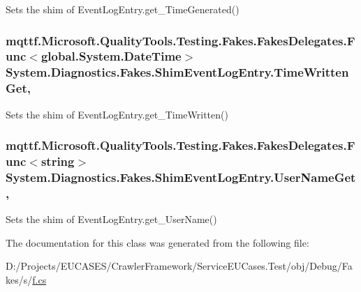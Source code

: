 Sets the shim of Event\-Log\-Entry.\-get\-\_\-\-Time\-Generated()

\hypertarget{class_system_1_1_diagnostics_1_1_fakes_1_1_shim_event_log_entry_a4a0c79ea960eb4727a22d11e10d6d453}{
\subsubsection[{Time\-Written\-Get}]{\setlength{\rightskip}{0pt plus 5cm}mqttf.\-Microsoft.\-Quality\-Tools.\-Testing.\-Fakes.\-Fakes\-Delegates.\-Func$<$global.\-System.\-Date\-Time$>$ System.\-Diagnostics.\-Fakes.\-Shim\-Event\-Log\-Entry.\-Time\-Written\-Get\hspace{0.3cm}{\ttfamily [get]}, {\ttfamily [set]}}}\label{class_system_1_1_diagnostics_1_1_fakes_1_1_shim_event_log_entry_a4a0c79ea960eb4727a22d11e10d6d453}


Sets the shim of Event\-Log\-Entry.\-get\-\_\-\-Time\-Written()

\hypertarget{class_system_1_1_diagnostics_1_1_fakes_1_1_shim_event_log_entry_adca7e82ce6f5efa75188ff6b972067f3}{
\subsubsection[{User\-Name\-Get}]{\setlength{\rightskip}{0pt plus 5cm}mqttf.\-Microsoft.\-Quality\-Tools.\-Testing.\-Fakes.\-Fakes\-Delegates.\-Func$<$string$>$ System.\-Diagnostics.\-Fakes.\-Shim\-Event\-Log\-Entry.\-User\-Name\-Get\hspace{0.3cm}{\ttfamily [get]}, {\ttfamily [set]}}}\label{class_system_1_1_diagnostics_1_1_fakes_1_1_shim_event_log_entry_adca7e82ce6f5efa75188ff6b972067f3}


Sets the shim of Event\-Log\-Entry.\-get\-\_\-\-User\-Name()



The documentation for this class was generated from the following file\-:\begin{DoxyCompactItemize}
\item 
D\-:/\-Projects/\-E\-U\-C\-A\-S\-E\-S/\-Crawler\-Framework/\-Service\-E\-U\-Cases.\-Test/obj/\-Debug/\-Fakes/s/\hyperlink{s_2f_8cs}{f.\-cs}\end{DoxyCompactItemize}
